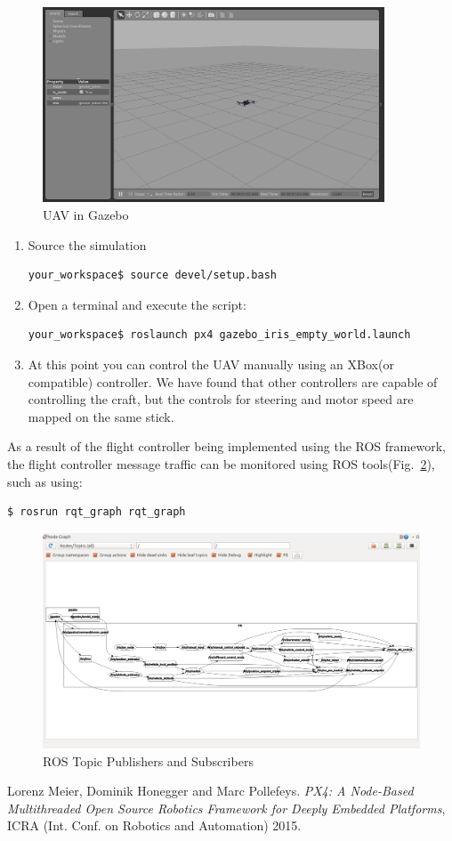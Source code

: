 \documentclass[10pt,a4paper,notitlepage]{report}
\begin{document}
\begin{figure}[h]
\includegraphics[width=4in]{rossitl.png}
\caption{UAV in Gazebo}
\label{fig:sim}
\end{figure}
\begin{enumerate}
\item Source the simulation
\begin{lstlisting}[language=bash]
your_workspace$ source devel/setup.bash 
\end{lstlisting}
\item Open a terminal and execute the script:
\begin{lstlisting}[language=bash]
your_workspace$ roslaunch px4 gazebo_iris_empty_world.launch 
\end{lstlisting}
\item At this point you can control the UAV manually using an XBox(or compatible) controller. We have found that other controllers are capable of controlling the craft, but the controls for steering and motor speed are mapped on the same stick.
\end{enumerate}


\noindent As a result of the flight controller being implemented using the ROS framework, the flight controller message traffic can be monitored using ROS tools(Fig.~\ref{fig:rostopics}), such as using:
\begin{lstlisting}[language=bash]
$ rosrun rqt_graph rqt_graph
\end{lstlisting}

\begin{figure}[h]
\includegraphics[scale=.35]{rqt_graph.png}
\caption{ROS Topic Publishers and Subscribers}
\label{fig:rostopics}
\end{figure}

\begin{thebibliography}{9}
Lorenz Meier, Dominik Honegger and Marc Pollefeys. \textit{PX4: A Node-Based Multithreaded Open Source Robotics Framework for Deeply Embedded Platforms}, ICRA (Int. Conf. on Robotics and Automation) 2015.
\end{thebibliography}
\end{document}
